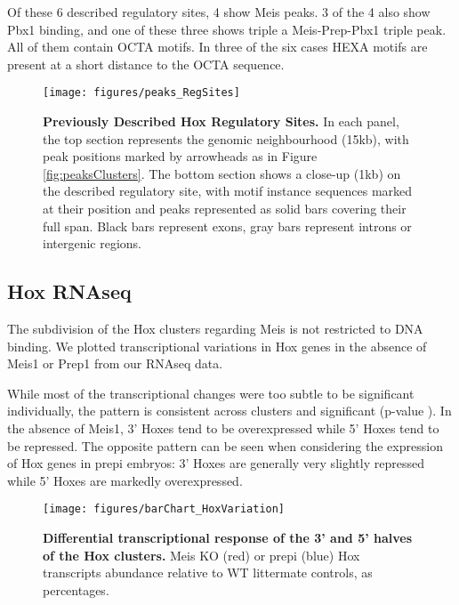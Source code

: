 Of these 6 described regulatory sites, 4 show Meis peaks. 3 of the 4 also show Pbx1 binding, and one of these three shows triple a Meis-Prep-Pbx1 triple peak. All of them contain \ac{OCTA} motifs. In three of the six cases \ac{HEXA} motifs are present at a short distance to the \ac{OCTA} sequence.

\begin{figure}[]
  \centering
  \texttt{[image: figures/peaks\_RegSites]}
  \caption[Previously Described Hox Regulatory Sites]{\textbf{Previously Described Hox Regulatory Sites.} In each panel, the top section represents the genomic neighbourhood (15kb), with peak positions marked by arrowheads as in Figure \ref{fig:peaksClusters}. The bottom section shows a close-up (1kb) on the described regulatory site, with motif instance sequences marked at their position and peaks represented as solid bars covering their full span. Black bars represent exons, gray bars represent introns or intergenic regions.}
  \label{fig:RegSites}
\end{figure}

\subsection{Hox RNAseq}

The subdivision of the Hox clusters regarding Meis is not restricted to DNA binding. We plotted transcriptional variations in Hox genes in the absence of Meis1 or Prep1 from our RNAseq data. 

While most of the transcriptional changes were too subtle to be significant individually, the pattern is consistent across clusters and significant (p-value ). In the absence of Meis1, 3' Hoxes tend to be overexpressed while 5' Hoxes tend to be repressed. The opposite pattern can be seen when considering the expression of Hox genes in \ac{prepi} embryos: 3' Hoxes are generally very slightly repressed while 5' Hoxes are markedly overexpressed.

\begin{SCfigure}[]
  \centering
  \texttt{[image: figures/barChart\_HoxVariation]}
  \caption[Differential transcriptional response of the 3' and 5' halves of the Hox clusters]{\textbf{Differential transcriptional response of the 3' and 5' halves of the Hox clusters.} Meis \ac{KO} (red) or \ac{prepi} (blue) Hox transcripts abundance relative to \ac{WT} littermate controls, as percentages.}
  \label{fig:HoxTranscript}
\end{SCfigure}


